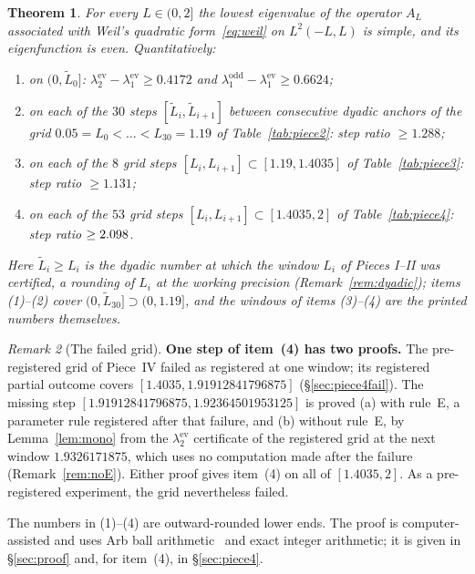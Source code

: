 \documentclass[11pt]{amsart}
\newcommand{\Lmax}{2}                                     %
\newcommand{\ev}{\mathrm{ev}}
\newcommand{\od}{\mathrm{odd}}
\newtheorem{theorem}{Theorem}[section]
\theoremstyle{definition}
\theoremstyle{remark}
\newtheorem{remark}[theorem]{Remark}
\numberwithin{equation}{section}
\begin{document}
\begin{theorem}\label{thm:main}
For every $L\in(0,\Lmax]$ the lowest eigenvalue of the operator $A_L$ associated with Weil's quadratic form~\eqref{eq:weil} on $L^2(-L,L)$ is simple, and its eigenfunction is even. Quantitatively:
\begin{enumerate}
\item on $(0,\tilde L_0]$: $\lambda_2^\ev-\lambda_1^\ev\ge0.4172$ and $\lambda_1^\od-\lambda_1^\ev\ge0.6624$;
\item on each of the $30$ steps $[\tilde L_i,\tilde L_{i+1}]$ between consecutive dyadic anchors of the grid $0.05=L_0<\dots<L_{30}=1.19$ of Table~\ref{tab:piece2}: step ratio $\ge1.288$;
\item on each of the $8$ grid steps $[L_i,L_{i+1}]\subset[1.19,1.4035]$ of Table~\ref{tab:piece3}: step ratio $\ge1.131$;
\item on each of the $53$ grid steps $[L_i,L_{i+1}]\subset[1.4035,2]$ of Table~\ref{tab:piece4}: step ratio $\ge2.098$.
\end{enumerate}
Here $\tilde L_i\ge L_i$ is the dyadic number at which the window $L_i$ of Pieces I--II was certified, a rounding of $L_i$ at the working precision (Remark~\ref{rem:dyadic}); items (1)--(2) cover $(0,\tilde L_{30}]\supset(0,1.19]$, and the windows of items (3)--(4) are the printed numbers themselves.
\end{theorem}

\begin{remark}[The failed grid]\label{rem:status}
\textbf{One step of item~(4) has two proofs.} The pre-registered grid of Piece~IV failed as registered at one window; its registered partial outcome covers $[1.4035,1.91912841796875]$ (\S\ref{sec:piece4fail}). The missing step $[1.91912841796875,1.92364501953125]$ is proved (a) with rule~E, a parameter rule registered after that failure, and (b) without rule~E, by Lemma~\ref{lem:mono} from the $\lambda_2^\ev$ certificate of the registered grid at the next window $1.9326171875$, which uses no computation made after the failure (Remark~\ref{rem:noE}). Either proof gives item~(4) on all of $[1.4035,\Lmax]$. As a pre-registered experiment, the grid nevertheless failed.
\end{remark}

The numbers in (1)--(4) are outward-rounded lower ends. The proof is computer-assisted and uses Arb ball arithmetic~\cite{Johansson,FLINT} and exact integer arithmetic; it is given in \S\ref{sec:proof} and, for item~(4), in \S\ref{sec:piece4}.
\end{document}
